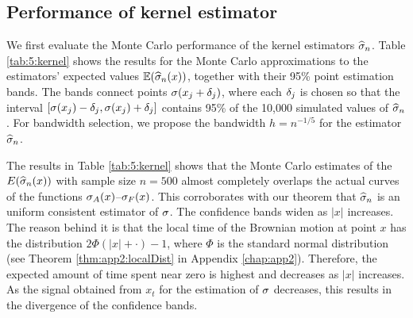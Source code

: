 \subsection{Performance of kernel estimator}
We first evaluate the Monte Carlo performance of the kernel estimators $\widehat{\sigma}_n$. Table \ref{tab:5:kernel} shows the results for the Monte Carlo approximations to the estimators' expected values $\mathbb E( \widehat{\sigma}_n(x) )$, together with their 95\% point estimation bands. The bands connect points $\sigma(x_j + \delta_j)$, where each $\delta_j$ is chosen so that the interval $[ \sigma(x_j) - \delta_j, \sigma(x_j) + \delta_j ]$ contains 95\% of the 10,000 simulated values of $\widehat{\sigma}_n$. For bandwidth selection, we propose the bandwidth $h = n^{-1/5}$ for the estimator $\widehat{\sigma}_n$.

\begin{sidewaystable}[!ht] 
\caption{Graphs over the interval $[-10, 10]$ of $\si_A(x)$--$\si_F(x)$ and Monte Carlo estimates of $\E ( \widehat{\si}(x) ) $ for $h = n^{-1/5}$, with $n$ = 500.}
\label{GseqTable} 
\end{sidewaystable}

The results in Table \ref{tab:5:kernel} shows that the Monte Carlo estimates of the $E(\widehat{\sigma}_n(x))$ with sample size $n = 500$ almost completely overlaps the actual curves of the functions $\si_A(x)$--$\si_F(x)$. This corroborates with our theorem that $\widehat{\sigma}_n$ is an uniform consistent estimator of $\sigma$. The confidence bands widen as $|x|$ increases. The reason behind it is that the local time of the Brownian motion at point $x$ has the distribution $2\Phi(|x|+\cdot) - 1$, where $\Phi$ is the standard normal distribution (see Theorem \ref{thm:app2:localDist} in Appendix \ref{chap:app2}). Therefore, the expected amount of time spent near zero is highest and decreases as $|x|$ increases. As the signal obtained from $x_t$ for the estimation of $\sigma$ decreases, this results in the divergence of the confidence bands.

